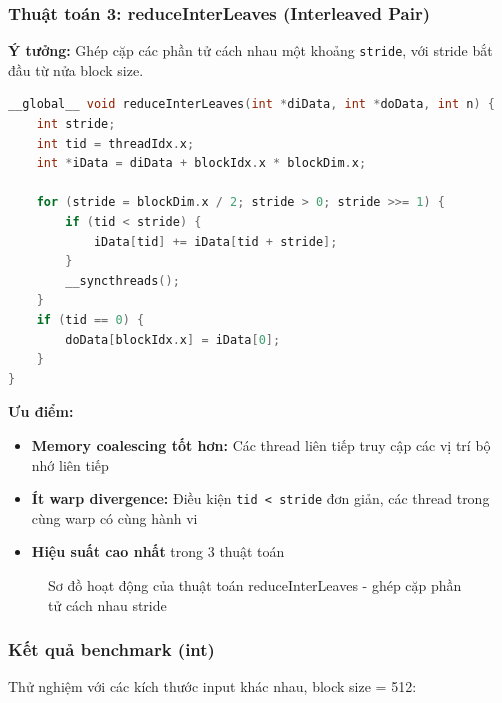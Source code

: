 \documentclass[12pt,a4paper]{article}
\begin{document}
\subsubsection{Thuật toán 3: reduceInterLeaves (Interleaved Pair)}

\textbf{Ý tưởng:} Ghép cặp các phần tử cách nhau một khoảng \texttt{stride}, với stride bắt đầu từ nửa block size.

\begin{lstlisting}[language=C++, caption=Kernel reduceInterLeaves]
__global__ void reduceInterLeaves(int *diData, int *doData, int n) {
    int stride;
    int tid = threadIdx.x;
    int *iData = diData + blockIdx.x * blockDim.x;

    for (stride = blockDim.x / 2; stride > 0; stride >>= 1) {
        if (tid < stride) {
            iData[tid] += iData[tid + stride];
        }
        __syncthreads();
    }
    if (tid == 0) {
        doData[blockIdx.x] = iData[0];
    }
}
\end{lstlisting}

\textbf{Ưu điểm:}
\begin{itemize}
    \item \textbf{Memory coalescing tốt hơn:} Các thread liên tiếp truy cập các vị trí bộ nhớ liên tiếp
    \item \textbf{Ít warp divergence:} Điều kiện \texttt{tid < stride} đơn giản, các thread trong cùng warp có cùng hành vi
    \item \textbf{Hiệu suất cao nhất} trong 3 thuật toán
\end{itemize}

\begin{figure}[h]
    \centering
    \caption{Sơ đồ hoạt động của thuật toán reduceInterLeaves - ghép cặp phần tử cách nhau stride}
    \label{fig:reduce_interleaves}
\end{figure}

\subsubsection{Kết quả benchmark (int)}

Thử nghiệm với các kích thước input khác nhau, block size = 512:
\end{document}
